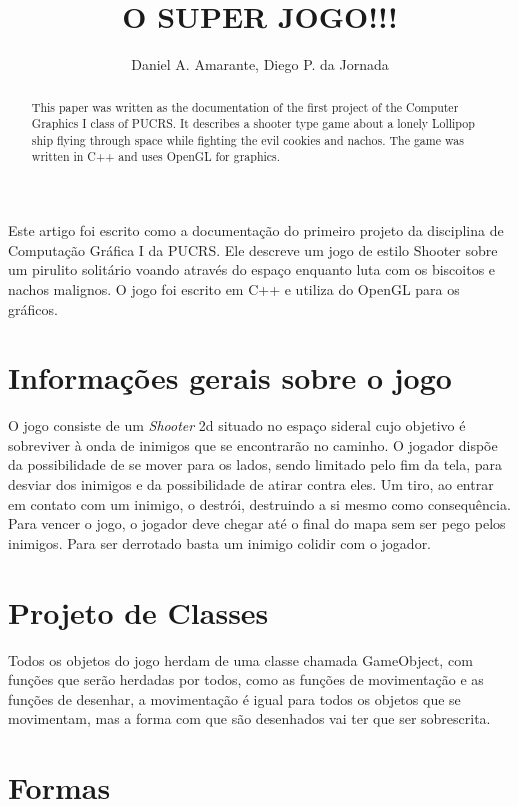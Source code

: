 \documentclass[12pt]{article}
\title{O SUPER JOGO!!!}
\author{Daniel A. Amarante, Diego P. da Jornada}
\begin{document}
 

\maketitle

\begin{abstract}
  This paper was written as the documentation of the first project of the Computer Graphics I class of PUCRS.
  It describes a shooter type game about a lonely Lollipop ship flying through space while fighting the evil
  cookies and nachos. The game was written in C++ and uses OpenGL for graphics.
\end{abstract}
     
\begin{resumo} 
  Este artigo foi escrito como a documentação do primeiro projeto da disciplina de Computação Gráfica I da PUCRS.
  Ele descreve um jogo de estilo Shooter sobre um pirulito solitário voando através do espaço enquanto luta com os
  biscoitos e nachos malignos. O jogo foi escrito em C++ e utiliza do OpenGL para os gráficos.
\end{resumo}

\section{Informações gerais sobre o jogo}

O jogo consiste de um \emph{Shooter} 2d situado no espaço sideral cujo objetivo é sobreviver à onda de inimigos que 
se encontrarão no caminho. O jogador dispõe da possibilidade de se mover para os lados, sendo limitado pelo fim da tela,
para desviar dos inimigos e da possibilidade de atirar contra eles. Um tiro, ao entrar em contato com um inimigo,
o destrói, destruindo a si mesmo como consequência. Para vencer o jogo, o jogador deve chegar até o final do mapa
sem ser pego pelos inimigos. Para ser derrotado basta um inimigo colidir com o jogador.

\section{Projeto de Classes}

Todos os objetos do jogo herdam de uma classe chamada GameObject, com funções que serão herdadas por todos, como as
funções de movimentação e as funções de desenhar, a movimentação é igual para todos os objetos que se movimentam, mas
a forma com que são desenhados vai ter que ser sobrescrita.

\section{Formas}
\end{document}
